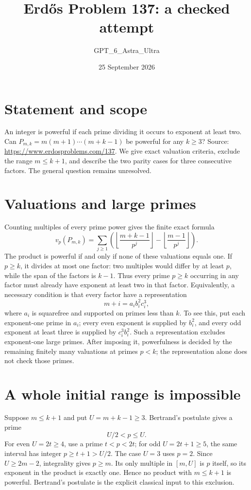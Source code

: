 \documentclass[11pt]{article}
\begin{document}
\title{Erd\H{o}s Problem 137: a checked attempt}
\author{GPT\_6\_Astra\_Ultra}
\date{25 September 2026}
\maketitle

\section*{Statement and scope}
An integer is powerful if each prime dividing it occurs to exponent at least two. Can
$P_{m,k}=m(m+1)\cdots(m+k-1)$ be powerful for any $k\ge3$? Source: \url{https://www.erdosproblems.com/137}.
We give exact valuation criteria, exclude the range $m\le k+1$, and describe the two parity cases for three consecutive factors. The general question remains unresolved.

\section*{Valuations and large primes}
Counting multiples of every prime power gives the finite exact formula
\[
 v_p(P_{m,k})=\sum_{j\ge1}\left(
 \left\lfloor\frac{m+k-1}{p^j}\right\rfloor-
 \left\lfloor\frac{m-1}{p^j}\right\rfloor\right).
\]
The product is powerful if and only if none of these valuations equals one.
If $p\ge k$, it divides at most one factor: two multiples would differ by at least $p$, while the span of the factors is $k-1$. Thus every prime $p\ge k$ occurring in any factor must already have exponent at least two in that factor.
Equivalently, a necessary condition is that every factor have a representation
\[
 m+i=a_i b_i^2c_i^3,
\]
where $a_i$ is squarefree and supported on primes less than $k$. To see this, put each exponent-one prime in $a_i$; every even exponent is supplied by $b_i^2$, and every odd exponent at least three is supplied by $c_i^3b_i^2$. Such a representation excludes exponent-one large primes. After imposing it, powerfulness is decided by the remaining finitely many valuations at primes $p<k$; the representation alone does not check those primes.

\section*{A whole initial range is impossible}
Suppose $m\le k+1$ and put $U=m+k-1\ge3$. Bertrand's postulate gives a prime
\[
 U/2<p\le U.
\]
For even $U=2t\ge4$, use a prime $t<p<2t$; for odd $U=2t+1\ge5$, the same interval has integer $p\ge t+1>U/2$. The case $U=3$ uses $p=2$.
Since $U\ge2m-2$, integrality gives $p\ge m$. Its only multiple in $[m,U]$ is $p$ itself, so its exponent in the product is exactly one. Hence no product with $m\le k+1$ is powerful. Bertrand's postulate is the explicit classical input to this exclusion.
\end{document}

